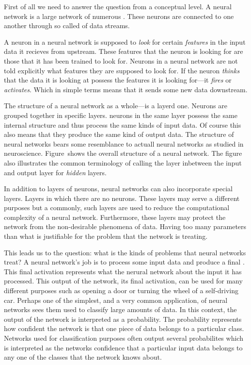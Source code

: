 \startsection[title=Machine learning concepts]
First of all we need to answer the question  from a conceptual level.
A neural network is a large network of numerous .
These neurons are connected to one another through so called  of data streams.

A neuron in a neural network is supposed to {\em look} for certain {\em features} in the input data it recieves from upstream.
These features that the neuron is looking for are those that it has been trained to look for.
Neurons in a neural network are not told explicitly what features they are supposed to look for.
If the neuron {\em thinks} that the data it is looking at possess the features it is looking for---it {\em fires} or {\em activates}.
Which in simple terms means that it sends some new data downstream.

The structure of a neural network as a whole---is a layerd one.
Neurons are grouped together in specific layers.
neurons in the same layer possess the same internal structure and thus process the same kinds of input data.
Of course this also means that they produce the same kind of output data.
The structure of neural networks bears some resemblance to actuall neural networks as studied in neuroscience.
Figure~ shows the overall structure of a neural network.
The figure also illustrates the common terminology of calling the layer inbetween the input and output layer for {\em hidden} layers.

\startplacefigure[
    reference=network-general-structure,
    location=bottom,
    title={Overview of a neural network structure~\cite[noah_2018]},
]
\stopplacefigure

In addition to layers of neurons, neural networks can also incorporate special  layers.
Layers in which there are no neurons.
These layers may serve a different purposes but a commonly, such layers are used to reduce the computational complexity of a neural network.
Furthermore, these layers may protect the network from the non-desirable phenomena of  data.
Having too many parameters than what is justifiable for the problem that the network is treating.

This leads us to the question: what is the kinds of problems that neural networks treat?
A neural network's job is to process some input data and produce a final .
This final activation represents what the nerural network  about the input it has processed.
This output of the network, its final activation, can be used for many different purposes such as opening a door or turning the wheel of a self-driving car.
Perhaps one of the simplest, and a very common application, of neural networks sees them used to classify large amounts of data.
In this context, the output of the network is interpreted as a probability.
The probability represents how confident the network is that one piece of data belongs to a particular class.
Networks used for classification purposes often output several probabilites which is interpreted as the networks confidence that a particular input data belongs to any one of the classes that the network knows about.

